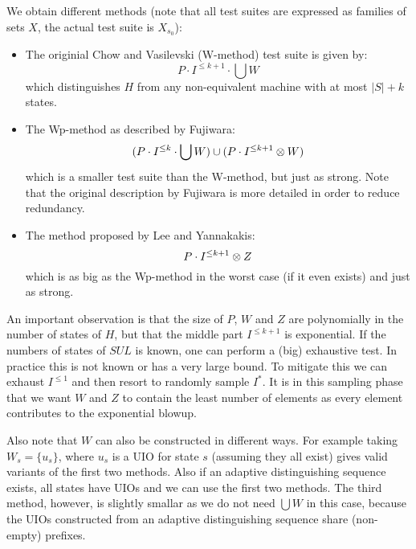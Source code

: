 \documentclass[envcountsame]{llncs}
\begin{document}
We obtain different methods (note that all test suites are expressed as families
of sets $X$, the actual test suite is $X_{s_0}$):
\begin{itemize}
	\item The originial Chow and Vasilevski (W-method) test suite is given by:
	$$ P \cdot I^{\leq k+1} \cdot \bigcup W $$
	which distinguishes $H$ from any non-equivalent machine with at
	most $|S| + k$ states.
	\item The Wp-method as described by Fujiwara:
	$$ (P \cdot I^{\leq k} \cdot \bigcup W) \cup (P \cdot I^{\leq k+1} \otimes W) $$
	which is a smaller test suite than the W-method, but just as strong. Note
	that the original description by Fujiwara is more detailed in order to
	reduce redundancy.
	\item The method proposed by Lee and Yannakakis:
	$$ P \cdot I^{\leq k+1} \otimes Z $$
	which is as big as the Wp-method in the worst case (if it even exists) and
	just as strong.
\end{itemize}

An important observation is that the size of $P$, $W$ and $Z$ are polynomially
in the number of states of $H$, but that the middle part $I^{\leq k+1}$ is
exponential. If the numbers of states of $SUL$ is known, one can perform a (big)
exhaustive test. In practice this is not known or has a very large bound. To
mitigate this we can exhaust $I^{\leq 1}$ and then resort to randomly sample $I
^\ast$. It is in this sampling phase that we want $W$ and $Z$ to contain the
least number of elements as every element contributes to the exponential blowup.

Also note that $W$ can also be constructed in different ways. For example taking
$W_s = \{ u_s \}$, where $u_s$ is a UIO for state $s$ (assuming they all exist)
gives valid variants of the first two methods. Also if an adaptive
distinguishing sequence exists, all states have UIOs and we can use the first
two methods. The third method, however, is slightly smallar as we do not need
$\bigcup W$ in this case, because the UIOs constructed from an adaptive
distinguishing sequence share (non-empty) prefixes.

\setcounter{tocdepth}{1}
\listoftodos
\end{document}

